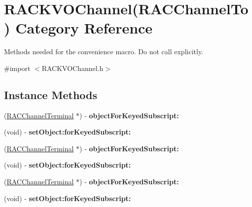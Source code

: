 \hypertarget{category_r_a_c_k_v_o_channel_07_r_a_c_channel_to_08}{}\section{R\+A\+C\+K\+V\+O\+Channel(R\+A\+C\+Channel\+To) Category Reference}
\label{category_r_a_c_k_v_o_channel_07_r_a_c_channel_to_08}


Methods needed for the convenience macro. Do not call explicitly.  




{\ttfamily \#import $<$R\+A\+C\+K\+V\+O\+Channel.\+h$>$}

\subsection*{Instance Methods}
\begin{DoxyCompactItemize}
\item 
\mbox{\label{category_r_a_c_k_v_o_channel_07_r_a_c_channel_to_08_a7d637c08acb87250b575eecde893c6cd}} 
(\mbox{\hyperlink{interface_r_a_c_channel_terminal}{R\+A\+C\+Channel\+Terminal}} $\ast$) -\/ {\bfseries object\+For\+Keyed\+Subscript\+:}
\item 
\mbox{\label{category_r_a_c_k_v_o_channel_07_r_a_c_channel_to_08_ae25f6ce87df9e7f9836e3b013fa22cc0}} 
(void) -\/ {\bfseries set\+Object\+:for\+Keyed\+Subscript\+:}
\item 
\mbox{\label{category_r_a_c_k_v_o_channel_07_r_a_c_channel_to_08_a7d637c08acb87250b575eecde893c6cd}} 
(\mbox{\hyperlink{interface_r_a_c_channel_terminal}{R\+A\+C\+Channel\+Terminal}} $\ast$) -\/ {\bfseries object\+For\+Keyed\+Subscript\+:}
\item 
\mbox{\label{category_r_a_c_k_v_o_channel_07_r_a_c_channel_to_08_ae25f6ce87df9e7f9836e3b013fa22cc0}} 
(void) -\/ {\bfseries set\+Object\+:for\+Keyed\+Subscript\+:}
\item 
\mbox{\label{category_r_a_c_k_v_o_channel_07_r_a_c_channel_to_08_a7d637c08acb87250b575eecde893c6cd}} 
(\mbox{\hyperlink{interface_r_a_c_channel_terminal}{R\+A\+C\+Channel\+Terminal}} $\ast$) -\/ {\bfseries object\+For\+Keyed\+Subscript\+:}
\item 
\mbox{\label{category_r_a_c_k_v_o_channel_07_r_a_c_channel_to_08_ae25f6ce87df9e7f9836e3b013fa22cc0}} 
(void) -\/ {\bfseries set\+Object\+:for\+Keyed\+Subscript\+:}
\end{DoxyCompactItemize}


